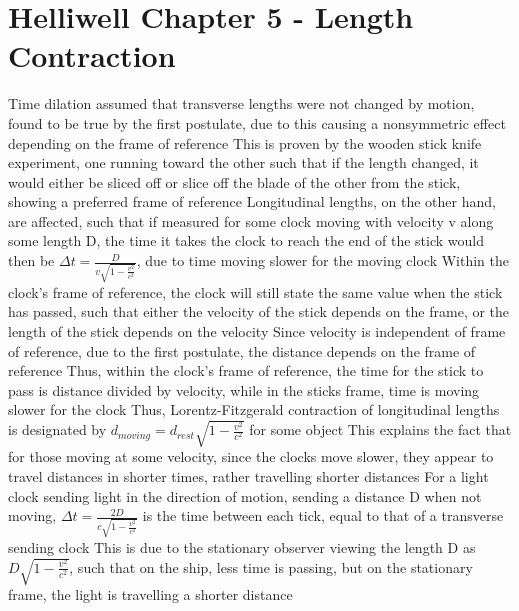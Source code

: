 \documentclass[11 pt, twoside]{article}
\newenvironment{outline*}
{
	\begin{outline}[enumerate]
	}
	{\end{outline}
}
\begin{document}
\section{Helliwell Chapter 5 - Length Contraction}
\begin{outline*}
\1 Time dilation assumed that transverse lengths were not changed by motion, found to be true by the first postulate, due to this causing a nonsymmetric effect depending on the frame of reference
\2 This is proven by the wooden stick knife experiment, one running toward the other such that if the length changed, it would either be sliced off or slice off the blade of the other from the stick, showing a preferred frame of reference
\1 Longitudinal lengths, on the other hand, are affected, such that if measured for some clock moving with velocity v along some length D, the time it takes the clock to reach the end of the stick would then be $\Delta t = \frac{D}{v\sqrt{1 - \frac{v^2}{c^2}}}$, due to time moving slower for the moving clock
\2 Within the clock's frame of reference, the clock will still state the same value when the stick has passed, such that either the velocity of the stick depends on the frame, or the length of the stick depends on the velocity
\3 Since velocity is independent of frame of reference, due to the first postulate, the distance depends on the frame of reference
\3 Thus, within the clock's frame of reference, the time for the stick to pass is distance divided by velocity, while in the sticks frame, time is moving slower for the clock
\2 Thus, Lorentz-Fitzgerald contraction of longitudinal lengths is designated by $d_{moving} = d_{rest}\sqrt{1 - \frac{v^2}{c^2}}$ for some object
\1 This explains the fact that for those moving at some velocity, since the clocks move slower, they appear to travel distances in shorter times, rather travelling shorter distances
\1 For a light clock sending light in the direction of motion, sending a distance D when not moving, $\Delta t = \frac{2D}{c\sqrt{1 - \frac{v^2}{c^2}}}$ is the time between each tick, equal to that of a transverse sending clock
\2 This is due to the stationary observer viewing the length D as $D\sqrt{1 - \frac{v^2}{c^2}}$, such that on the ship, less time is passing, but on the stationary frame, the light is travelling a shorter distance
\end{outline*}
\end{document}
